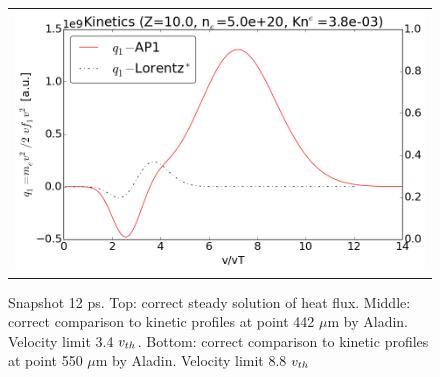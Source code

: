 \begin{figure}[tbh]
\begin{center}
\begin{tabular}{c}
      \includegraphics[width=\figscale\textwidth]{../VFPdata/C7_Aladin_case3_nonlocal_kinetics.png}  
    \end{tabular}
  \caption{  
  Snapshot 12 ps. Top: correct steady solution of heat flux.  
  Middle: correct comparison to kinetic profiles at point 442 $\mu$m by Aladin. 
  Velocity limit 3.4 $v_{th}$.
  Bottom: correct comparison to kinetic profiles at point 550 $\mu$m by Aladin.
  Velocity limit 8.8 $v_{th}$
  }
  \label{fig:C7_Aladin_case3}
  \end{center} 
\end{figure}

